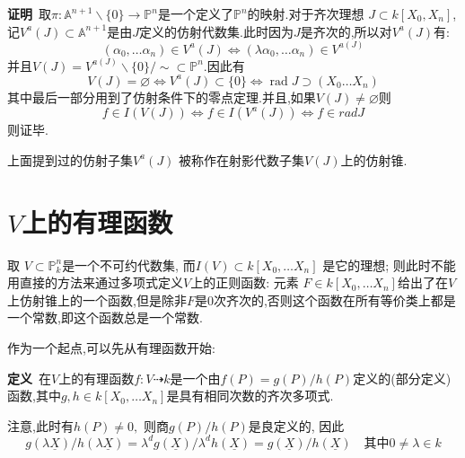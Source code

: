 \documentclass[UTF8]{book}
\begin{document}
		
		\textbf{证明}\ 取$\pi: \mathbb{A} ^{n+1} \backslash\{0\} \rightarrow \mathbb{P}^{n}$是一个定义了$\mathbb{P} ^{n}$的映射.对于齐次理想 $J \subset k \left[ X _{0}, X _{ n }\right]$,记$V ^{ a }( J ) \subset \mathbb{A} ^{ n +1}$是由$ J $定义的仿射代数集.此时因为$ J $是齐次的,所以对$V ^{ a }( J )$有:
		\begin{equation*}
		\left(\alpha_{0}, \dots \alpha_{n}\right) \in V ^{ a }( J ) \Longleftrightarrow\left(\lambda \alpha_{0}, \dots \alpha_{n}\right) \in V ^{ a ( J )}
		\end{equation*}
		并且$V ( J )= V ^{ a ( J )} \backslash\{0\} / \sim \subset \mathbb{P} ^{ n } .$因此有
		\begin{equation*}
		V ( J )=\varnothing \Longleftrightarrow V ^{ a }( J ) \subset\{0\} \Longleftrightarrow \operatorname{rad} J \supset\left( X _{0} \ldots X _{ n }\right)
		\end{equation*}
		其中最后一部分用到了仿射条件下的零点定理.并且,如果$V ( J ) \neq \varnothing$则
		\begin{equation*}
		f \in I ( V ( J )) \Longleftrightarrow f \in I \left( V ^{ a }( J )\right) \Longleftrightarrow f \in rad J 
		\end{equation*}
		则证毕.
		
		
		上面提到过的仿射子集$V ^{ a }( J )$ 被称作在射影代数子集$ V(J) $上的仿射锥.
		
		
	\section{$ V $上的有理函数}
		取 $V \subset \mathbb{P} ^{ n }_{k}$是一个不可约代数集, 而$I ( V ) \subset k \left[ X _{0}, \ldots X _{ n }\right]$ 是它的理想; 则此时不能用直接的方法来通过多项式定义$ V $上的正则函数: 元素 $F \in k \left[ X _{0}, \ldots X _{ n }\right]$给出了在$ V $上仿射锥上的一个函数,但是除非$ F $是0次齐次的,否则这个函数在所有等价类上都是一个常数,即这个函数总是一个常数.
		
		
		作为一个起点,可以先从有理函数开始:
		
		
		\textbf{定义}\ 在$V$上的有理函数$f : V \dashrightarrow k$是一个由$f ( P )= g ( P ) / h ( P )$定义的(部分定义)函数,其中$ g , h \in k \left[ X _{0}, \ldots X _{ n }\right]$是具有相同次数的齐次多项式.
		
		注意,此时有$h ( P ) \neq 0,$ 则商$g ( P ) / h ( P )$是良定义的, 因此
		\begin{equation*}
		g (\lambda \underline{ X }) / h (\lambda \underline{ X })=\lambda^{ d}  g (\underline{ X }) / \lambda^{d} h (\underline{ X })= g (\underline{ X }) / h (\underline{ X }) \quad \text {其中} 0 \neq \lambda \in k
		\end{equation*}
		
\end{document}
